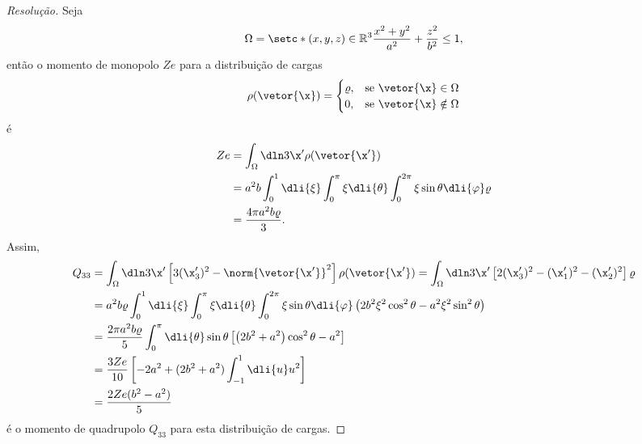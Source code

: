 \begin{proof}[Resolução]
    Seja
    \begin{equation*}
        \Omega = \setc*{(x,y,z) \in \mathbb{R}^3}{\frac{x^2 + y^2}{a^2} + \frac{z^2}{b^2} \leq 1},
    \end{equation*}
    então o momento de monopolo \(Ze\) para a distribuição de cargas
    \begin{equation*}
        \rho(\vetor{\x}) = \begin{cases}
            \varrho,&\text{se }\vetor{\x} \in \Omega\\
            0,&\text{se }\vetor{\x} \notin \Omega
        \end{cases}
    \end{equation*}
    é
    \begin{align*}
        Ze &= \int_{\Omega} \dln3{\x'} \rho(\vetor{\x'})\\
           &= a^2b\int_0^1 \dli{\xi} \int_0^\pi \xi \dli{\theta} \int_0^{2\pi} \xi \sin\theta \dli{\varphi} \varrho\\
           &= \frac{4 \pi a^2 b \varrho}{3}.
    \end{align*}
    Assim,
    \begin{align*}
        Q_{33} &= \int_{\Omega}\dln3{\x'} \left[3(\x'_3)^2 - \norm{\vetor{\x'}}^2\right]\rho(\vetor{\x'}) = \int_{\Omega}\dln3{\x'} \left[2(\x'_3)^2 - (\x'_1)^2 - (\x'_2)^2\right]\varrho\\
               &= a^2 b \varrho \int_0^1 \dli{\xi} \int_0^\pi \xi\dli{\theta} \int_0^{2\pi} \xi \sin\theta\dli{\varphi} \left(2b^2\xi^2 \cos^2\theta - a^2\xi^2 \sin^2\theta\right)\\
               &= \frac{2\pi a^2 b\varrho}{5} \int_0^\pi \dli{\theta} \sin\theta \left[\left(2b^2 + a^2\right)\cos^2\theta - a^2\right]\\
               &= \frac{3 Ze}{10} \left[-2a^2 + (2b^2 + a^2)\int_{-1}^1 \dli{u} u^2\right]\\
               &= \frac{2Ze(b^2 - a^2)}{5}
    \end{align*}
    é o momento de quadrupolo \(Q_{33}\) para esta distribuição de cargas.
\end{proof}

